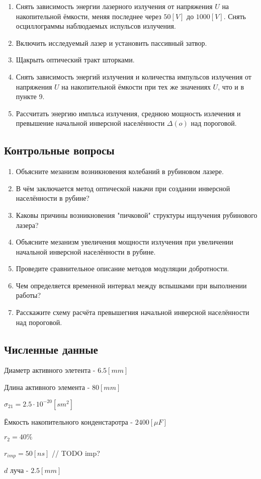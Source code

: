 \documentclass[a4paper,14pt,russian]{article}
\begin{document}
\begin{enumerate}
\item Снять зависимость энергии лазерного излучения от напряжения $U$ на накопительной ёмкости, меняя последнее через $50 [V]$ до $1000 [V]$. Снять осциллограммы наблюдаемых испульсов излучения.
\item Включить исследуемый лазер и установить пассивный затвор.
\item Щакрыть оптический тракт шторками.
\item Снять зависимость энергий излучения и количества импульсов излучения от напряжения $U$ на накопительной ёмкости при тех же значениях $U$, что и в пункте 9.
\item Рассчитать энергию импльса излучения, среднюю мощность излечения и превышение начальной инверсной населённости $\Delta(o)$ над пороговой.
\end{enumerate}

\subsection{Контрольные вопросы}

\begin{enumerate}
\item Объясните мезанизм возникновения колебаний в рубиновом лазере.
\item В чём заключается метод оптической накачи при создании инверсной населённости в рубине?
\item Каковы причины возникновения "пичковой" структуры ищлучения рубинового лазера?
\item Объясните мезанизм увеличения мощности излучения при увеличении начальной инверсной населённости в рубине.
\item Проведите сравнительное описание методов модуляции добротности.
\item Чем определяется временной интервал между вспышками при выполнении работы?
\item Расскажите схему расчёта превышегния начальной инверсной населённости над пороговой.
\end{enumerate}

\subsection{Численные данные}
Диаметр активного элетента - $6.5 [mm]$

Длина активного элемента - $80 [mm]$

$\sigma_{21} = 2.5 \cdot 10^{-20} [sm^2]$

Ёмкость накопительного конденстаротра - $2400 [\mu F]$

$r_2 = 40\%$

$r_{imp} = 50 [ns]$ // TODO imp?

$d$ луча - $2.5 [mm]$
\end{document}
